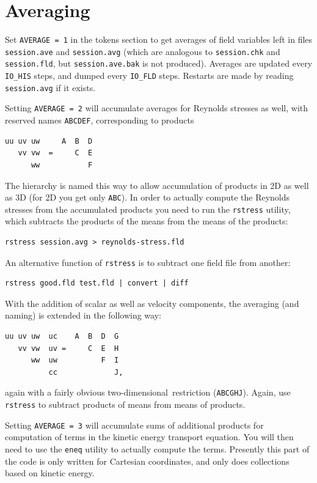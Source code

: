 \documentclass[11pt]{report}
\newcommand\twod{two-di\-men\-sion\-al}
\begin{document}
\section{Averaging}
\label{sec.average}

Set \verb+AVERAGE = 1+ in the tokens section to get averages of field
variables left in files \verb+session.ave+ and \verb+session.avg+
(which are analogous to \verb+session.chk+ and \verb+session.fld+, but
\verb+session.ave.bak+ is not produced).  Averages are updated
every \verb+IO_HIS+ steps, and dumped every \verb+IO_FLD+ steps.
Restarts are made by reading \verb+session.avg+ if it exists.

Setting \verb+AVERAGE = 2+ will accumulate averages for Reynolds
stresses as well, with reserved names \verb+ABCDEF+, corresponding to
products
%
{\small
\begin{verbatim}
uu uv uw     A  B  D
   vv vw  =     C  E
      ww           F
\end{verbatim}
}
%
The hierarchy is named this way to allow accumulation of products in 2D
as well as 3D (for 2D you get only \verb+ABC+).  In order to actually
compute the Reynolds stresses from the accumulated products you need
to run the \verb+rstress+ utility, which subtracts the products of the
means from the means of the products:
\begin{verbatim}
rstress session.avg > reynolds-stress.fld
\end{verbatim}
An alternative function of \verb+rstress+ is to subtract one field
file from another:
\begin{verbatim}
rstress good.fld test.fld | convert | diff
\end{verbatim}

With the addition of scalar as well as velocity components, the
averaging (and naming) is extended in the following way:
%
{\small
\begin{verbatim}
uu uv uw  uc    A  B  D  G
   vv vw  uv =     C  E  H
      ww  uw          F  I
          cc             J,
\end{verbatim}
}
%
\noindent
again with a fairly obvious \twod\ restriction (\verb|ABCGHJ|).
Again, use \verb|rstress| to subtract products of means from means
of products.

Setting \verb+AVERAGE = 3+ will accumulate sums of additional products
for computation of terms in the kinetic energy transport equation. You
will then need to use the \verb+eneq+ utility to actually compute the
terms. Presently this part of the code is only written for Cartesian
coordinates, and only does collections based on kinetic energy.
\end{document}
